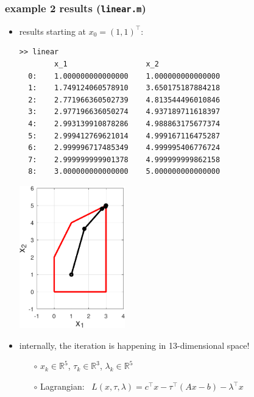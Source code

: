 \documentclass[10pt,hyperref,dvipsnames]{beamer}
\newcommand{\RR}{\mathbb{R}}
\begin{document}
\begin{frame}[fragile]
\frametitle{example 2 results (\texttt{linear.m})}

\begin{itemize}
\item results starting at $x_0=(1,1)^\top$:

\bigskip
\begin{Verbatim}[fontsize=\tiny]
>> linear
        x_1                  x_2
  0:    1.000000000000000    1.000000000000000
  1:    1.749124060578910    3.650175187884218
  2:    2.771966360502739    4.813544496010846
  3:    2.977196636050274    4.937189711618397
  4:    2.993139910878286    4.988863175677374
  5:    2.999412769621014    4.999167116475287
  6:    2.999996717485349    4.999995406776724
  7:    2.999999999901378    4.999999999862158
  8:    3.000000000000000    5.000000000000000
\end{Verbatim}

\vspace{-31mm}
\hfill \includegraphics[width=0.36\textwidth]{figs/linear.pdf}

\item internally, the iteration is happening in 13-dimensional space!
    \begin{itemize}
    \item[$\circ$] $x_k \in \RR^5$, \quad $\tau_k \in \RR^3$, \quad $\lambda_k \in \RR^5$
    \item[$\circ$] Lagrangian: \, $L(x,\tau,\lambda) = c^\top x - \tau^\top (Ax - b) - \lambda^\top x$
    \end{itemize}
\end{itemize}
\end{frame}
\end{document}
